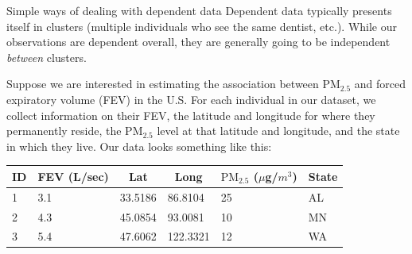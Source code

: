 \documentclass[10pt,t]{beamer}
\begin{document}
\begin{frame}{Simple ways of dealing with dependent data}
Dependent data typically presents itself in clusters (multiple individuals who see the same dentist, etc.). While our observations are dependent overall, they are generally going to be independent \textit{between} clusters. 

\vspace{0.3cm}

\pause Suppose we are interested in estimating the association between $\text{PM}_{2.5}$ and forced expiratory volume (FEV) in the U.S. For each individual in our dataset, we collect information on their FEV, the latitude and longitude for where they permanently reside, the $\text{PM}_{2.5}$ level at that latitude and longitude, and the state in which they live. Our data looks something like this:

\vspace{0.3cm}

\begin{table}[]
	\begin{tabular}{l|l|l|l|l|l}
		\multicolumn{1}{c|}{ID} & \multicolumn{1}{c|}{FEV (L/sec)} & \multicolumn{1}{c|}{Lat} & \multicolumn{1}{c|}{Long} & \multicolumn{1}{c|}{$\text{PM}_{2.5}$ ($\mu$g/$m^3$)} & \multicolumn{1}{c}{State} \\ \hline
		1                                   & 3.1                                & 33.5186                  & 86.8104                   & 25                          & AL                   \\
		2                                   & 4.3                                & 45.0854                  & 93.0081                   & 10                          & MN                \\
		3                                   & 5.4                                & 47.6062                  & 122.3321                  & 12                          & WA             
	\end{tabular}
\end{table}

\end{frame}
\end{document}
